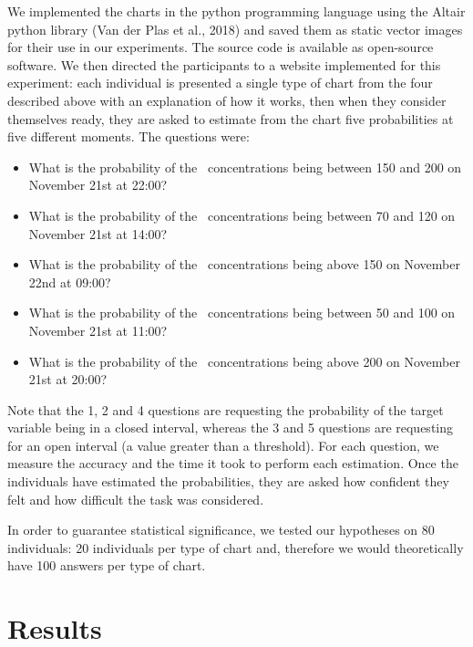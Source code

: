 \documentclass[a4paper,3p,sort&compress]{elsarticle}
\begin{document}
We implemented the charts in the python programming language using the Altair
python library (Van der Plas et al., 2018) \cite{vanderplas2018altair} 
and saved them as static vector
images for their use in our experiments. The source code is available as
open-source software. 
We then directed the participants
to a website implemented for this experiment: each individual is presented a
single type of chart from the four described above with an explanation of how it
works, then when they consider themselves ready, they are asked to estimate from
the chart five probabilities at five different moments. The questions were:
\begin{itemize}
  \item What is the probability of the \no~concentrations being between 150 and 200 on November 21st at 22:00?
  \item What is the probability of the \no~concentrations being between 70 and 120 on November 21st at 14:00?
  \item What is the probability of the \no~concentrations being above 150 on November 22nd at 09:00?
  \item What is the probability of the \no~concentrations being between 50 and 100 on November 21st at 11:00?
  \item What is the probability of the \no~concentrations being above 200 on November 21st at 20:00?
\end{itemize}

Note that the 1, 2 and 4 questions are requesting the
probability of the target variable being in a closed interval, whereas the
3 and 5 questions are requesting for an open interval (a value
greater than a threshold). For each question, we measure the accuracy and the
time it took to perform each estimation. Once the individuals have estimated the
probabilities, they are asked how confident they felt and how difficult the task
was considered.

In order to guarantee statistical significance, we tested our hypotheses on 80
individuals: 20 individuals per type of chart and, therefore we would
theoretically have 100 answers per type of chart.

\section{Results}
\label{sec:results}
\end{document}
